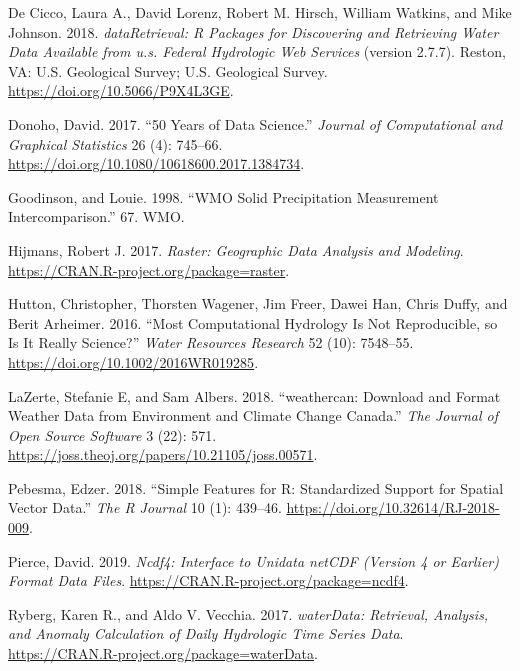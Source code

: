 \begin{CSLReferences}{1}{0}
\leavevmode{}%
De Cicco, Laura A., David Lorenz, Robert M. Hirsch, William Watkins, and Mike Johnson. 2018. \emph{dataRetrieval: R Packages for Discovering and Retrieving Water Data Available from u.s. Federal Hydrologic Web Services} (version 2.7.7). Reston, VA: U.S. Geological Survey; U.S. Geological Survey. \url{https://doi.org/10.5066/P9X4L3GE}.

\leavevmode{}%
Donoho, David. 2017. {``50 {Years} of {Data} {Science}.''} \emph{Journal of Computational and Graphical Statistics} 26 (4): 745--66. \url{https://doi.org/10.1080/10618600.2017.1384734}.

\leavevmode{}%
Goodinson, and Louie. 1998. {``{WMO} {Solid} {Precipitation} {Measurement} {Intercomparison}.''} 67. WMO.

\leavevmode{}%
Hijmans, Robert J. 2017. \emph{Raster: Geographic Data Analysis and Modeling}. \url{https://CRAN.R-project.org/package=raster}.

\leavevmode{}%
Hutton, Christopher, Thorsten Wagener, Jim Freer, Dawei Han, Chris Duffy, and Berit Arheimer. 2016. {``Most Computational Hydrology Is Not Reproducible, so Is It Really Science?''} \emph{Water Resources Research} 52 (10): 7548--55. \url{https://doi.org/10.1002/2016WR019285}.

\leavevmode{}%
LaZerte, Stefanie E, and Sam Albers. 2018. {``{weathercan}: {D}ownload and Format Weather Data from Environment and Climate Change Canada.''} \emph{The Journal of Open Source Software} 3 (22): 571. \url{https://joss.theoj.org/papers/10.21105/joss.00571}.

\leavevmode{}%
Pebesma, Edzer. 2018. {``{Simple Features for R: Standardized Support for Spatial Vector Data}.''} \emph{{The R Journal}} 10 (1): 439--46. \url{https://doi.org/10.32614/RJ-2018-009}.

\leavevmode{}%
Pierce, David. 2019. \emph{Ncdf4: Interface to Unidata netCDF (Version 4 or Earlier) Format Data Files}. \url{https://CRAN.R-project.org/package=ncdf4}.

\leavevmode{}%
Ryberg, Karen R., and Aldo V. Vecchia. 2017. \emph{waterData: Retrieval, Analysis, and Anomaly Calculation of Daily Hydrologic Time Series Data}. \url{https://CRAN.R-project.org/package=waterData}.


\end{CSLReferences}
